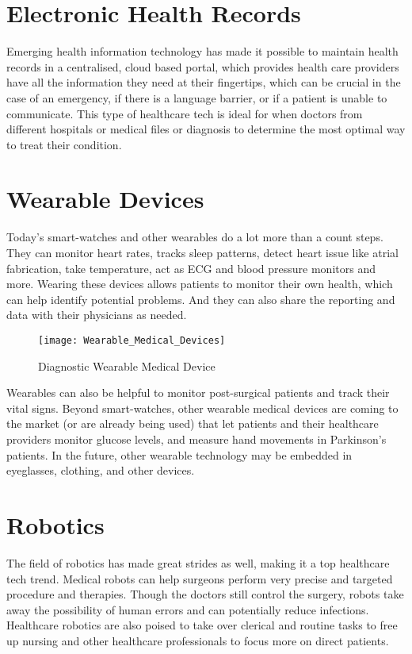 \documentclass[12pt]{article}
\begin{document}
\section{Electronic Health Records}

Emerging health information technology has made it possible to maintain health records in a centralised, cloud based portal, which provides health care providers have all the information they need at their fingertips, which can be crucial in the case of an emergency, if there is a language barrier, or if a patient is unable to communicate. This type of healthcare tech is ideal for when doctors from different hospitals or medical files or diagnosis to determine the most optimal way to treat their condition.

\section{Wearable Devices}

Today's smart-watches and other wearables do a lot more than a count steps. They can monitor heart rates, tracks sleep patterns, detect heart issue like atrial fabrication, take temperature, act as ECG and blood pressure monitors and more. Wearing these devices allows patients to monitor their own health, which can help identify potential problems. And they can also share the reporting and data with their physicians as needed.

\begin{figure}[h]
\centering
\texttt{[image: Wearable\_Medical\_Devices]}
\caption{Diagnostic Wearable Medical Device}
\end{figure}

 Wearables can also be helpful to monitor post-surgical patients and track their vital signs. Beyond smart-watches, other wearable medical devices are coming to the market (or are already being used) that let patients and their healthcare providers monitor glucose levels, and measure hand movements in Parkinson's patients. In the future, other wearable technology may be embedded in eyeglasses, clothing, and other devices.                         

\section{Robotics}

The field of robotics has made great strides as well, making it a top healthcare tech trend. Medical robots can help surgeons perform very precise and targeted procedure and therapies. Though the doctors still control the surgery, robots take away the possibility of human errors and can potentially reduce infections. Healthcare robotics are also poised to take over clerical and routine tasks to free up nursing and other healthcare professionals to focus more on direct patients.
\end{document}
